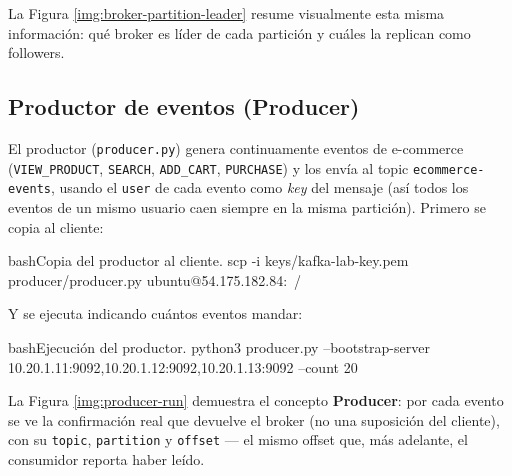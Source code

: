 		La Figura \ref{img:broker-partition-leader} resume visualmente esta misma información: qué broker es líder de cada partición y cuáles la replican como followers.


	\subsection{Productor de eventos (Producer)}

		El productor (\texttt{producer.py}) genera continuamente eventos de e-commerce (\texttt{VIEW\_PRODUCT}, \texttt{SEARCH}, \texttt{ADD\_CART}, \texttt{PURCHASE}) y los envía al topic \texttt{ecommerce-events}, usando el \texttt{user} de cada evento como \textit{key} del mensaje (así todos los eventos de un mismo usuario caen siempre en la misma partición). Primero se copia al cliente:

		\begin{sourcecode}[\label{codigo-scp-producer}]{bash}{Copia del productor al cliente.}
scp -i keys/kafka-lab-key.pem producer/producer.py ubuntu@54.175.182.84:~/
		\end{sourcecode}

		Y se ejecuta indicando cuántos eventos mandar:

		\begin{sourcecode}[\label{codigo-run-producer}]{bash}{Ejecución del productor.}
python3 producer.py --bootstrap-server 10.20.1.11:9092,10.20.1.12:9092,10.20.1.13:9092 --count 20
		\end{sourcecode}


		La Figura \ref{img:producer-run} demuestra el concepto \textbf{Producer}: por cada evento se ve la confirmación real que devuelve el broker (no una suposición del cliente), con su \texttt{topic}, \texttt{partition} y \texttt{offset} — el mismo offset que, más adelante, el consumidor reporta haber leído.

